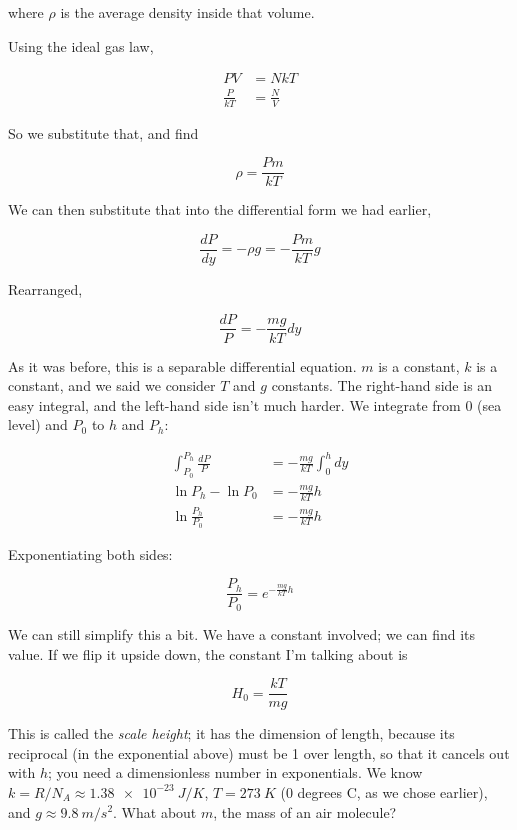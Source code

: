 where $\rho$ is the average density inside that volume.

Using the ideal gas law,

\begin{align}
PV &= N k T\\
\frac{P}{k T} &= \frac{N}{V}
\end{align}

So we substitute that, and find

\begin{equation}
\rho = \frac{P m}{k T}
\end{equation}

We can then substitute that into the differential form we had earlier,

\begin{equation}
\frac{dP}{dy} = - \rho g = - \frac{P m }{k T} g
\end{equation}

Rearranged,

\begin{equation}
\frac{dP}{P}  = - \frac{m g}{k T} dy
\end{equation}

As it was before, this is a separable differential equation. $m$ is a constant, $k$ is a constant, and we said we consider $T$ and $g$ constants. The right-hand side is an easy integral, and the left-hand side isn't much harder. We integrate from $0$ (sea level) and $P_0$ to $h$ and $P_h$:

\begin{align}
\int_{P_0}^{P_h} \frac{dP}{P}  &= - \frac{m g}{k T} \int_0^h dy\\
\ln P_h - \ln P_0  &= - \frac{m g}{k T} h\\
\ln \frac{P_h}{P_0} &= - \frac{m g}{k T} h
\end{align}

Exponentiating both sides:

\begin{equation}
\frac{P_h}{P_0} = e^{- \frac{m g}{k T} h}
\end{equation}

We can still simplify this a bit. We have a constant involved; we can find its value. If we flip it upside down, the constant I'm talking about is

\begin{equation}
H_0 = \frac{k T}{m g}
\end{equation}

This is called the \emph{scale height}; it has the dimension of length, because its reciprocal (in the exponential above) must be 1 over length, so that it cancels out with $h$; you need a dimensionless number in exponentials. We know $k = R/N_A \approx \SI{1.38e-23}{J/K}$, $T = \SI{273}{K}$ (0 degrees C, as we chose earlier), and $g \approx \SI{9.8}{m/s^2}$. What about $m$, the mass of an air molecule?

